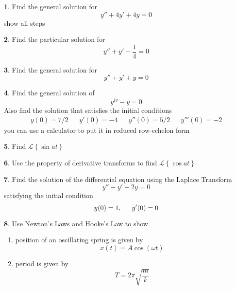 \documentclass[11pt]{article}
\newcommand{\laplace}[1]{$ \mathcal{L}  \left\{ #1 \right\}$}
\theoremstyle{definition}
\newtheorem{q}{}
\begin{document}
\begin{multicols*}{2}
\begin{q}
			Find the general solution for \[ y'' + 4y' + 4y = 0 \] show all steps
		\end{q}
		\begin{q}
			Find the particular solution for \[ y'' + y' - \dfrac{1}{4} = 0 \]
		\end{q}
		\begin{q}
			Find the general solution for \[ y'' + y' + y = 0 \]
		\end{q}
		\begin{q}
			Find the general solution of \[ y^{iv} - y = 0 \] Also find the solution that satisfies the initial conditions 
			\begin{align*}
			y(0) = 7/2 && y'(0) = -4 && y''(0)= 5/2 && y'''(0) = -2
			\end{align*}
			you can use a calculator to put it in reduced row-echelon form 
		\end{q}
		\begin{q}
			Find \laplace{\sin at}
		\end{q}
		\begin{q}
			Use the property of derivative transforms to find \laplace{\cos at}
		\end{q}
		\begin{q}
			Find the solution of the differential equation using the Laplace Transform\[ y'' -y' - 2y = 0 \] satisfying the initial condition \[ y(0) = 1, \indent y'(0) = 0 \]
		\end{q}
		\begin{q}
			Use Newton's Laws and Hooke's Law to show
			\begin{enumerate}
				\item position of an oscillating spring is given by \[ x(t) =  A \cos (\omega t) \]
				\item period is given by \[ T = 2 \pi \sqrt{\dfrac{m}{k}} \]
			\end{enumerate}
		
		\end{q}
	\end{multicols*}
\end{document}
